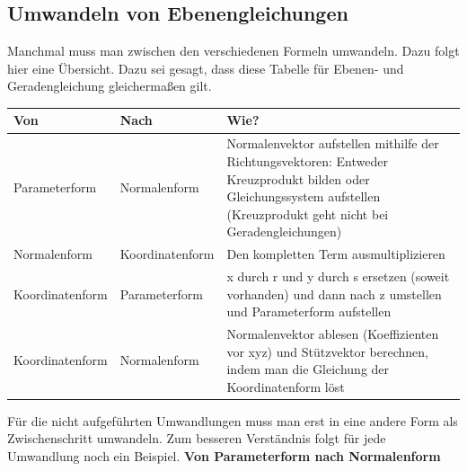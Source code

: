 \documentclass[12pt]{article}
\begin{document}
		\subsection{Umwandeln von Ebenengleichungen}
		\noindent Manchmal muss man zwischen den verschiedenen Formeln umwandeln. Dazu folgt hier eine Übersicht. Dazu sei gesagt, dass diese Tabelle für Ebenen- und Geradengleichung gleichermaßen gilt.
		\begin{center}
			\bgroup
			\def\arraystretch{1.75}
			\begin{tabularx}{\textwidth}{|l|l|X|}
				\hline
				\textbf{Von} & \textbf{Nach} & \textbf{Wie?} \\ \hline
				Parameterform & Normalenform & Normalenvektor aufstellen mithilfe der Richtungsvektoren: Entweder Kreuzprodukt bilden oder Gleichungssystem aufstellen (Kreuzprodukt geht nicht bei Geradengleichungen) \\ \hline
				Normalenform & Koordinatenform & Den kompletten Term ausmultiplizieren \\ \hline
				Koordinatenform & Parameterform & x durch r und y durch s ersetzen (soweit vorhanden) und dann nach z umstellen und Parameterform aufstellen \\ \hline
				Koordinatenform & Normalenform & Normalenvektor ablesen (Koeffizienten vor xyz) und Stützvektor berechnen, indem man die Gleichung der Koordinatenform löst \\
				\hline
			\end{tabularx}
			\egroup
		\end{center}
		Für die nicht aufgeführten Umwandlungen muss man erst in eine andere Form als Zwischenschritt umwandeln. Zum besseren Verständnis folgt für jede Umwandlung noch ein Beispiel.\newline\newline
		\textbf{Von Parameterform nach Normalenform}
\end{document}
